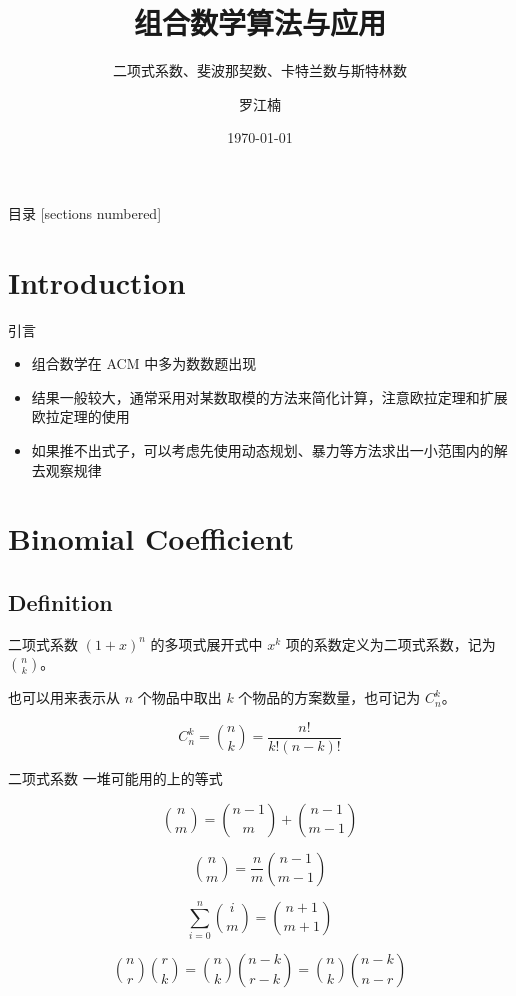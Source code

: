 \documentclass[12pt,aspectratio=169,handout]{beamer}
\title{组合数学算法与应用}
\subtitle{二项式系数、斐波那契数、卡特兰数与斯特林数}
\date{\today}
\author{罗江楠}
\institute{哈尔滨工业大学（威海）}
\begin{document}
\maketitle

\begin{frame}{目录}
  [sections numbered]
  \tableofcontents[hideallsubsections]
\end{frame}

\section[引言]{Introduction}

\begin{frame}[fragile]{引言}
  \begin{itemize}
    \item 组合数学在 ACM 中多为数数题出现
    \item 结果一般较大，通常采用对某数取模的方法来简化计算，注意欧拉定理和扩展欧拉定理的使用
    \item 如果推不出式子，可以考虑先使用动态规划、暴力等方法求出一小范围内的解去观察规律
  \end{itemize}
\end{frame}

\section[二项式系数]{Binomial Coefficient}

\subsection[二项式系数]{Definition}

\begin{frame}[fragile]{二项式系数}
$(1+x)^n$ 的多项式展开式中 $x^k$ 项的系数定义为二项式系数，记为 ${n \choose k}$。

也可以用来表示从 $n$ 个物品中取出 $k$ 个物品的方案数量，也可记为 $C_n^k$。

$$
C_n^k = {n \choose k} = \frac{n!}{k!(n-k)!}
$$
\end{frame}

\begin{frame}[fragile]{二项式系数}
一堆可能用的上的等式

$$
{n \choose m} = {n-1 \choose m} + {n-1 \choose m-1}
$$

$$
{n \choose m} = \frac{n}{m} {n-1 \choose m-1}
$$

$$
\sum_{i=0}^{n} {i \choose m} = {n+1 \choose m+1}
$$

$$
{n \choose r}{r \choose k} = {n \choose k} {n-k \choose r-k} = {n \choose k} {n-k \choose n-r}
$$
\end{frame}
\end{document}

